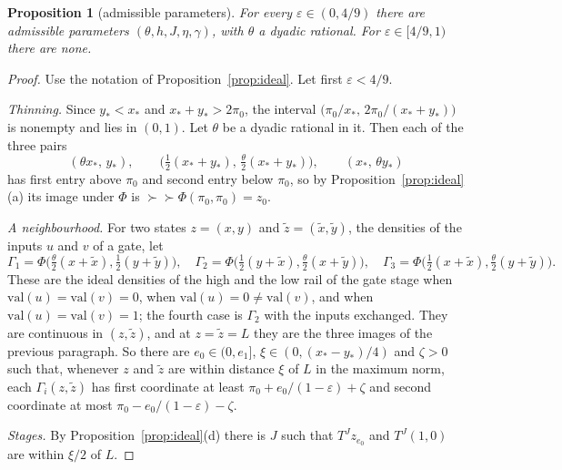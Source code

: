 \documentclass[11pt]{amsart}
\newtheorem{proposition}[theorem]{Proposition}
\theoremstyle{definition}
\theoremstyle{remark}
\newcommand{\eps}{\varepsilon}
\newcommand{\val}{\mathrm{val}}
\begin{document}
\begin{proposition}[admissible parameters]\label{prop:adm}
For every $\eps\in(0,4/9)$ there are admissible parameters $(\theta,h,J,\eta,\gamma)$, with
$\theta$ a dyadic rational. For $\eps\in[4/9,1)$ there are none.
\end{proposition}

\begin{proof}
Use the notation of Proposition~\ref{prop:ideal}. Let first $\eps<4/9$.

\emph{Thinning.} Since $y_*<x_*$ and $x_*+y_*>2\pi_0$, the interval
$\bigl(\pi_0/x_*,\,2\pi_0/(x_*+y_*)\bigr)$ is nonempty and lies in $(0,1)$. Let $\theta$ be a
dyadic rational in it. Then each of the three pairs
\[
(\theta x_*,\,y_*),\qquad\bigl(\tfrac12(x_*+y_*),\,\tfrac\theta2(x_*+y_*)\bigr),\qquad(x_*,\,\theta y_*)
\]
has first entry above $\pi_0$ and second entry below $\pi_0$, so by
Proposition~\ref{prop:ideal}(a) its image under $\Phi$ is $\succ\!\!\succ\Phi(\pi_0,\pi_0)=z_0$.

\emph{A neighbourhood.} For two states $z=(x,y)$ and $\tilde z=(\tilde x,\tilde y)$, the
densities of the inputs $u$ and $v$ of a gate, let
\[
\Gamma_1=\Phi\bigl(\tfrac\theta2(x+\tilde x),\tfrac12(y+\tilde y)\bigr),\quad
\Gamma_2=\Phi\bigl(\tfrac12(y+\tilde x),\tfrac\theta2(x+\tilde y)\bigr),\quad
\Gamma_3=\Phi\bigl(\tfrac12(x+\tilde x),\tfrac\theta2(y+\tilde y)\bigr).
\]
These are the ideal densities of the high and the low rail of the gate stage when
$\val(u)=\val(v)=0$, when $\val(u)=0\ne\val(v)$, and when $\val(u)=\val(v)=1$; the fourth case
is $\Gamma_2$ with the inputs exchanged. They are continuous in $(z,\tilde z)$, and at
$z=\tilde z=L$ they are the three images of the previous paragraph. So there are $e_0\in(0,e_1]$, $\xi\in(0,(x_*-y_*)/4)$ and $\zeta>0$
such that, whenever $z$ and $\tilde z$ are within distance $\xi$ of $L$ in the maximum norm, each
$\Gamma_i(z,\tilde z)$ has first coordinate at least $\pi_0+e_0/(1-\eps)+\zeta$ and second
coordinate at most $\pi_0-e_0/(1-\eps)-\zeta$.

\emph{Stages.} By Proposition~\ref{prop:ideal}(d) there is $J$ such that $T^Jz_{e_0}$ and
$T^J(1,0)$ are within $\xi/2$ of $L$.


\end{proof}
\end{document}
